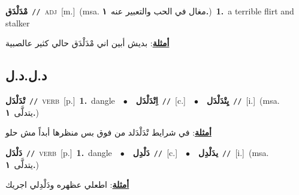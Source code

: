 \documentclass[10pt,a4paper,twoside]{article} %
\begin{document}
\begin{multicols}{2}
{\setlength\topsep{0pt}\textbf{\foreignlanguage{arabic}{مْدَلْدَق}}\ {\color{gray}\texttt{//}\color{black}}\ \textsc{adj}\ [m.]\ \color{gray}(msa. \foreignlanguage{arabic}{مغال في الحب والتعبير عنه}~\foreignlanguage{arabic}{\textbf{١.}})\color{black}\ \textbf{1.}~a terrible flirt and stalker\  \begin{flushright}\color{gray}\foreignlanguage{arabic}{\textbf{\underline{\foreignlanguage{arabic}{أمثلة}}}: بديش أبين اني مْدَلْدَق حالي كثير عالصبية}\end{flushright}\color{black}} \vspace{2mm}

\vspace{-3mm}
\subsection*{\color{blue}\foreignlanguage{arabic}{د.ل.د.ل}\color{blue}{}} 

{\setlength\topsep{0pt}\textbf{\foreignlanguage{arabic}{تْدَلْدَل}}\ {\color{gray}\texttt{//}\color{black}}\ \textsc{verb}\ [p.]\ \textbf{1.}~dangle\ \ $\bullet$\ \ \setlength\topsep{0pt}\textbf{\foreignlanguage{arabic}{اِتْدَلْدَل}}\ {\color{gray}\texttt{//}\color{black}}\ [c.]\ \ $\bullet$\ \ \setlength\topsep{0pt}\textbf{\foreignlanguage{arabic}{يِتْدَلْدَل}}\ {\color{gray}\texttt{//}\color{black}}\ [i.]\ \color{gray}(msa. \foreignlanguage{arabic}{يتدلَّى}~\foreignlanguage{arabic}{\textbf{١.}})\color{black}\  \begin{flushright}\color{gray}\foreignlanguage{arabic}{\textbf{\underline{\foreignlanguage{arabic}{أمثلة}}}: في شرايط تْدَلْدَلد من فوق بس منظرها أبداً مش حلو}\end{flushright}\color{black}} \vspace{2mm}

{\setlength\topsep{0pt}\textbf{\foreignlanguage{arabic}{دَلْدَل}}\ {\color{gray}\texttt{//}\color{black}}\ \textsc{verb}\ [p.]\ \textbf{1.}~dangle\ \ $\bullet$\ \ \setlength\topsep{0pt}\textbf{\foreignlanguage{arabic}{دَلْدِل}}\ {\color{gray}\texttt{//}\color{black}}\ [c.]\ \ $\bullet$\ \ \setlength\topsep{0pt}\textbf{\foreignlanguage{arabic}{يدَلْدِل}}\ {\color{gray}\texttt{//}\color{black}}\ [i.]\ \color{gray}(msa. \foreignlanguage{arabic}{يتدلَّى}~\foreignlanguage{arabic}{\textbf{١.}})\color{black}\  \begin{flushright}\color{gray}\foreignlanguage{arabic}{\textbf{\underline{\foreignlanguage{arabic}{أمثلة}}}: اطعلي عظهره ودَلْدِلي اجريك}\end{flushright}\color{black}} \vspace{2mm}


\end{multicols}
\end{document}
